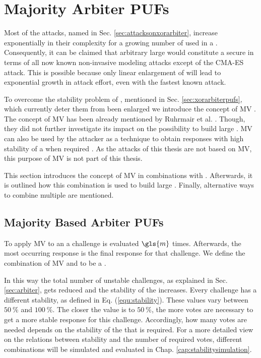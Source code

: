 \chapter{Majority Arbiter PUFs}
\label{cap:majorityarbiter}

Most of the attacks, named in Sec. \ref{sec:attacksonxorarbiter}, increase exponentially in their complexity for a growing number of used \apufs in a \xpuf.  %
Consequently, it can be claimed that arbitrary large \xpufs would constitute a secure \puf in terms of all now known non-invasive modeling attacks except of the \ac{CMA-ES} attack.
This is possible because only linear enlargement of \xpufs will lead to exponential growth in attack effort, even with the fastest known attack.

To overcome the stability problem of \xpufs, mentioned in Sec. \ref{sec:xorarbiterpufs}, which currently deter them from been enlarged we introduce the concept of \ac{MV} \cite{Majzoobi2010FPGALines}. %
The concept of \ac{MV} has been already mentioned by Ruhrmair et al. \cite{Ruhrmair2013PUFData}.
Though, they did not further investigate its impact on the possibility to build large \xpufs. %
\ac{MV} can also be used by the attacker as a technique to obtain responses with high stability of a \puf when required \cite{Ganji2016PACPUFs, Ozturk2008TowardsDevices}.
As the attacks of this thesis are not based on \ac{MV}, this purpose of \ac{MV} is not part of this thesis.

This section introduces the concept of \ac{MV} in combinations with \apufs.
Afterwards, it is outlined how this combination is used to build large \xpufs.
Finally, alternative ways to combine multiple \apufs are mentioned.


\section{Majority Based Arbiter PUFs}
\label{sec:majorityarbiter}

To apply \ac{MV} to an \apuf a challenge is evaluated $\gls{m}$ times.
Afterwards, the most occurring response is the final response for that challenge.
We define the combination of \ac{MV} and \apuf to be a \mpuf.

In this way the total number of unstable challenges, as explained in Sec. \ref{sec:arbiter}, gets reduced and the stability of the \apuf increases. %
Every challenge has a different stability, as defined in Eq. (\ref{equ:stability}).%
These values vary between $50\ \%$ and $100\ \%$.
The closer the value is to $50\ \%$, the more votes are necessary to get a more stable response for this challenge. %
Accordingly, how many votes are needed depends on the stability of the \apuf that is required. 
For a more detailed view on the relations between stability and the number of required votes, different combinations will be simulated and evaluated in Chap. \ref{cap:stabilitysimulation}.

